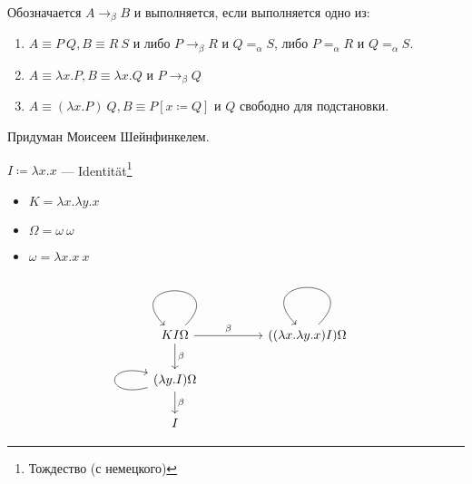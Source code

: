 \begin{definition}
    Обозначается \(A \to_\beta B\) и выполняется, если выполняется одно из:
    \begin{enumerate}
        \item \(A \equiv P\ Q, B \equiv R\ S\) и либо \(P \to_\beta R\) и \(Q =_\alpha S\), либо \(P =_\alpha R\) и \(Q =_\alpha S\).
        \item \(A \equiv \lambda x.P, B \equiv \lambda x.Q\) и \(P \to_\beta Q\)
        \item \(A \equiv (\lambda x.P)\ Q, B \equiv P [x \coloneqq Q]\) и \(Q\) свободно для подстановки.
    \end{enumerate}
\end{definition}

\begin{definition}
    Придуман Моисеем Шейнфинкелем.

    \(I \coloneqq \lambda x.x\) --- Identit\"
    at\footnote{Тождество (с немецкого)}
\end{definition}

\begin{definition}\itemfix
    \begin{itemize}
        \item \(K = \lambda x.\lambda y.x\)
        \item \(\Omega = \omega\ \omega\)
        \item \(\omega = \lambda x.x\ x\)
    \end{itemize}
\end{definition}

\begin{example}
    \[\begin{tikzcd}[ampersand replacement=\&]
            KI\Omega \arrow{rr}{\beta} \arrow{d}{\beta} \arrow[loop] \&  \& ((\lambda x.\lambda y.x) I) \Omega \arrow[loop] \\
            (\lambda y.I) \Omega \arrow[loop left] \arrow{d}{\beta}                                                              \&  \&                                                                                          \\
            I                                                                                                    \&  \&
        \end{tikzcd}\]
\end{example}

